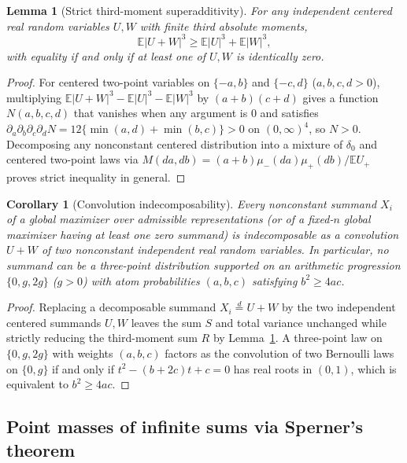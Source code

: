 \documentclass[11pt]{article}
\numberwithin{equation}{section}
\newtheorem{lemma}[theorem]{Lemma}
\newtheorem{corollary}[theorem]{Corollary}
\theoremstyle{definition}
\newcommand{\E}{\mathbb E}
\begin{document}
\begin{lemma}[Strict third-moment superadditivity]\label{lem:strict-cubic-splitting}
For any independent centered real random variables $U,W$ with finite third
absolute moments,
\[
                 \E|U+W|^3\ge\E|U|^3+\E|W|^3,
\]
with equality if and only if at least one of $U,W$ is identically zero.
\end{lemma}
\begin{proof}
For centered two-point variables on $\{-a,b\}$ and $\{-c,d\}$ ($a,b,c,d>0$),
multiplying $\E|U+W|^3-\E|U|^3-\E|W|^3$ by $(a+b)(c+d)$ gives a function
$N(a,b,c,d)$ that vanishes when any argument is $0$ and satisfies
$\partial_a\partial_b\partial_c\partial_d N=12\{\min(a,d)+\min(b,c)\}>0$ on
$(0,\infty)^4$, so $N>0$. Decomposing any nonconstant centered distribution
into a mixture of $\delta_0$ and centered two-point laws via
$M(da,db)=(a+b)\mu_-(da)\mu_+(db)/\E U_+$ proves strict inequality in
general.
\end{proof}

\begin{corollary}[Convolution indecomposability]\label{cor:original-indecomposable}
Every nonconstant summand $X_i$ of a global maximizer over admissible
representations (or of a fixed-$n$ global maximizer having at least one zero
summand) is indecomposable as a convolution $U+W$ of two nonconstant
independent real random variables. In particular, no summand can be a
three-point distribution supported on an arithmetic progression $\{0,g,2g\}$
($g>0$) with atom probabilities $(a,b,c)$ satisfying $b^2\ge4ac$.
\end{corollary}
\begin{proof}
Replacing a decomposable summand $X_i\stackrel d=U+W$ by the two independent
centered summands $U,W$ leaves the sum $S$ and total variance unchanged while
strictly reducing the third-moment sum $R$ by Lemma~\ref{lem:strict-cubic-splitting}.
A three-point law on $\{0,g,2g\}$ with weights $(a,b,c)$ factors as the
convolution of two Bernoulli laws on $\{0,g\}$ if and only if
$t^2-(b+2c)t+c=0$ has real roots in $(0,1)$, which is equivalent to
$b^2\ge4ac$.
\end{proof}

\subsection{Point masses of infinite sums via Sperner's theorem}
\end{document}
